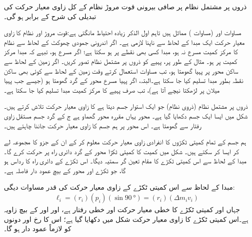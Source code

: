  ذروں پر مشتمل نظام  پر صافی بیرونی قوت مروڑ     نظام کے کل زاوی معیار حرکت  کی تبدیلی کی شرح کے برابر ہو گی۔
 
 مساوات  اور   (مساوات )   مماثل ہیں  تاہم  اول الذکر  زیادہ احتیاط مانگتی  ہے:قوت مروڑ اور نظام کا زاوی معیار حرکت ایک  مبدا کے لحاظ سے   ناپنا لازمی ہے۔ اگر  اندرونی جمودی چھوکٹ  کے لحاظ سے نظام کا مرکز کمیت  مسرع نہ ہو،  مبدا کسی بھی نقطے پر ہو سکتا ہے؛ اگر مسرع ہو، تبہے کہ    مبدا مرکز کمیت پر  ہو۔ مثال کے طور پر،  پہیے کو ذروں پر مشتمل نظام تصور کریں۔ اگر زمین کے لحاظ سے ساکن  محور پر پہیا   گھومتا ہو، تب مساوات   استعمال  کرتے وقت زمین کے لحاظ سے کوئی بھی ساکن نقطہ بطور مبدا تسلیم کیا جا سکتا ہے۔البتہ، اگر پہیا مسرع محور کے گرد گھومتا ہو (جیسے جب پہیا میلان پر لڑھکتا نیچے آتا ہے)،  تب صرف پہیے کا مرکز کمیت مبدا  تسلیم کیا جا سکتا ہے۔
 
 ذروں پر مشتمل  نظام  (ذروی نظام) جو ایک استوار جسم دیتا ہے کا  زاوی معیار حرکت   تلاش کرتے ہیں۔ شکل  میں ایسا ایک جسم دکھایا گیا ہے۔ محور  یہاں مقررہ محور گھماو  ہے ج کے گرد جسم مستقل زاوی رفتار  سے گھومتا ہے۔ اس محور پر ہم جسم کا زاوی معیار حرکت جاننا چاہتے ہیں۔
 
 ہم جسم کے   تمام کمیتی ٹکڑوں کا انفرادی زاوی معیار حرکت معلوم کر کے   ان کے  جزو  کا مجموعہ لے کر ایسا کر سکتے ہیں۔ شکل  میں  کمیت  کا کمیتی  ٹکڑا   محور  کے گرد  دائری راہ پر حرکت کرے گا۔ مبدا  کے لحاظ سے اس   کمیتی ٹکڑے کا مقام تعین گر سمتیہ  دیگا۔ اس ٹکڑے کے دائری راہ کا رداس  ہو گا، جو ٹکڑے اور محور  کے بیچ عمود دار فاصلہ ہے۔
 
 مبدا  کے لحاظ سے اس کمیتی ٹکڑے کے زاوی معیار حرکت    کی قدر مساوات  دیگی:
 \begin{align*}
 \ell_i=(r_i)(p_i)(\sin\SI{90}{\degree})=(r_i)(\Delta m_iv_i)
 \end{align*}
 جہاں   اور  کمیتی ٹکڑے کا خطی معیار حرکت اور خطی رفتار ہے، اور   اور  کے بیچ زاویہ  ہے۔اس کمیتی ٹکڑے کا زاوی معیار حرکت  شکل  میں دکھایا گیا ہے؛ اس کا رخ  اور  دونوں کو  لازماً عمود دار ہو گا۔
 
